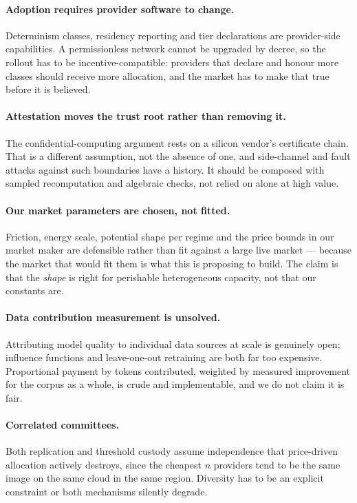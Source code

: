 \documentclass[11pt,a4paper]{article}
\begin{document}
\paragraph{Adoption requires provider software to change.} Determinism classes,
residency reporting and tier declarations are provider-side capabilities. A
permissionless network cannot be upgraded by decree, so the rollout has to be
incentive-compatible: providers that declare and honour more classes should
receive more allocation, and the market has to make that true before it is
believed.

\paragraph{Attestation moves the trust root rather than removing it.} The
confidential-computing argument rests on a silicon vendor's certificate chain.
That is a different assumption, not the absence of one, and side-channel and fault
attacks against such boundaries have a history. It should be composed with
sampled recomputation and algebraic checks, not relied on alone at high value.

\paragraph{Our market parameters are chosen, not fitted.} Friction, energy scale,
potential shape per regime and the price bounds in our market maker are defensible
rather than fit against a large live market --- because the market that would fit
them is what this is proposing to build. The claim is that the \emph{shape} is
right for perishable heterogeneous capacity, not that our constants are.

\paragraph{Data contribution measurement is unsolved.} Attributing model quality
to individual data sources at scale is genuinely open; influence functions and
leave-one-out retraining are both far too expensive. Proportional payment by
tokens contributed, weighted by measured improvement for the corpus as a whole, is
crude and implementable, and we do not claim it is fair.

\paragraph{Correlated committees.} Both replication and threshold custody assume
independence that price-driven allocation actively destroys, since the cheapest
$n$ providers tend to be the same image on the same cloud in the same region.
Diversity has to be an explicit constraint or both mechanisms silently degrade.
\end{document}
